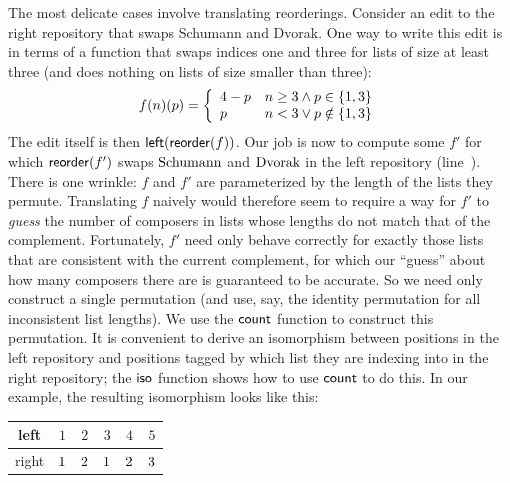 The most delicate cases involve translating reorderings.
Consider an edit to the right repository that swaps Schumann and
Dvorak.  One way to write this edit is in terms of
a function that swaps 
indices one and three for lists of size at least three (and does nothing on
lists of size smaller than three):
\[f(n)(p) = \left\{\begin{array}{ll}
    4-p & n \ge 3 \land p \in \{1, 3\} \\
    p & n < 3 \lor p \notin \{1, 3\}
    \end{array}\right.\]
The edit itself is then $\mathsf{left}(\mathsf{reorder}(f))$. Our job is now to compute
some $f'$ for which $\mathsf{reorder}(f')$ swaps ${\mbox{Schumann}}$ and
${\mbox{Dvorak}}$ in the left repository
(line~). There is one wrinkle: $f$ 
and $f'$ are parameterized by the length of the lists they permute.
Translating $f$ naively would therefore seem to require a way for $f'$ to
\emph{guess}  the number of composers in lists whose lengths do not
match that of the complement. Fortunately,
$f'$ need only behave correctly for exactly those lists that are consistent
with the current complement, for which our ``guess'' about how many
composers there are is guaranteed to be accurate.  So 
we need only construct a single permutation (and use, say, the
identity permutation for all inconsistent list lengths).
%
We use the $\mathsf{count}$ function to construct this permutation.
It is convenient to derive an isomorphism between positions in the left
repository and positions tagged by which list they are indexing into in the
right repository; the $\mathsf{iso}$ function shows how to use $\mathsf{count}$ to do
this. In our example, the resulting isomorphism looks like this:
\begin{center}
\noindent \begin{tabular}{c|ccccc}
    left  & $1$ & $2$ & $3$ & $4$ & $5$ \\
    \hline
    right & $ 1$ & $ 2$ & $ 1$ & $ 2$ & $ 3$
\end{tabular}
\end{center}

